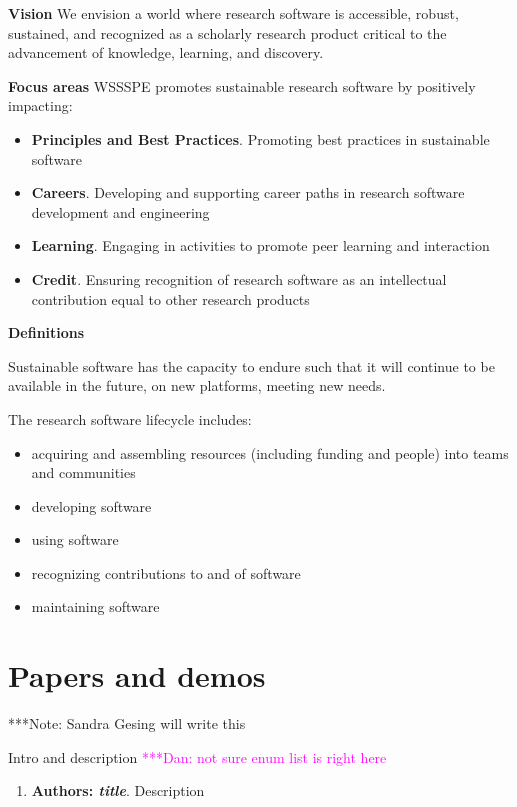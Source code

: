 \documentclass[11pt, oneside]{amsart}
\newcommand{\note}[1]{ {\textcolor{blueish}    { ***Note:      #1 }}}
\newcommand{\katznote}[1]{ {\textcolor{magenta}    { ***Dan:      #1 }}}
\begin{document}
{\bf Vision}
We envision a world where research software is accessible, robust, sustained, and recognized as a scholarly research product critical to the advancement of knowledge, learning, and discovery.

{\bf Focus areas}
WSSSPE promotes sustainable research software by positively impacting:
\begin{itemize}
\item {\bf Principles and Best Practices}. Promoting best practices in sustainable software
\item {\bf Careers}. Developing and supporting career paths in research software development and engineering
\item {\bf Learning}. Engaging in activities to promote peer learning and interaction
\item {\bf Credit}. Ensuring recognition of research software as an intellectual contribution equal to other research products
\end{itemize}

{\bf Definitions}

Sustainable software has the capacity to endure such that it will continue to be available in the future, on new platforms, meeting new needs.

The research software lifecycle includes:
\begin{itemize}
\item acquiring and assembling resources (including funding and people) into teams and communities
\item developing software
\item using software
\item recognizing contributions to and of software
\item maintaining software
\end{itemize}


\section{Papers and demos} \label{sec:papers}

\note{Sandra Gesing will write this}

Intro and description \katznote{not sure enum list is right here}
%
\begin{enumerate}
\item \textbf{Authors: \emph{title}}.
Description

\end{enumerate}
\end{document}
